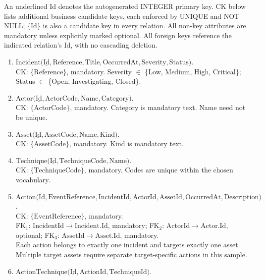\documentclass[sigconf]{acmart}
\begin{document}
An underlined \(\text{Id}\) denotes the autogenerated INTEGER primary key. CK below
lists additional business candidate keys, each enforced by UNIQUE and NOT
NULL; \(\{\text{Id}\}\) is also a candidate key in every relation. All non-key
attributes are mandatory unless explicitly marked optional. All foreign keys
reference the indicated relation's \(\text{Id}\), with no cascading deletion.
\begin{enumerate}
\item \(\text{Incident}\mathopen{(}\underline{\text{Id}},\text{Reference},\text{Title},\text{OccurredAt},\text{Severity},\text{Status}\mathclose{)}\).\\
CK: \(\{\text{Reference}\}\), mandatory. Severity \(\in\) \{Low, Medium, High, Critical\};
Status \(\in\) \{Open, Investigating, Closed\}.
\item \(\text{Actor}\mathopen{(}\underline{\text{Id}},\text{ActorCode},\text{Name},\text{Category}\mathclose{)}\).\\
CK: \(\{\text{ActorCode}\}\), mandatory. Category is mandatory text. Name need not be unique.
\item \(\text{Asset}\mathopen{(}\underline{\text{Id}},\text{AssetCode},\text{Name},\text{Kind}\mathclose{)}\).\\
CK: \(\{\text{AssetCode}\}\), mandatory. Kind is mandatory text.
\item \(\text{Technique}\mathopen{(}\underline{\text{Id}},\text{TechniqueCode},\text{Name}\mathclose{)}\).\\
CK: \(\{\text{TechniqueCode}\}\), mandatory. Codes are unique within the chosen vocabulary.
\item \(\text{Action}\mathopen{(}\underline{\text{Id}},\text{EventReference},\text{IncidentId},\text{ActorId},\text{AssetId},\text{OccurredAt},\text{Description}\mathclose{)}\).\\
CK: \(\{\text{EventReference}\}\), mandatory.\\
FK\(_1\): \(\text{IncidentId}\to \text{Incident}.\text{Id}\), mandatory;
FK\(_2\): \(\text{ActorId}\to \text{Actor}.\text{Id}\), optional;
FK\(_3\): \(\text{AssetId}\to \text{Asset}.\text{Id}\), mandatory.\\
Each action belongs to exactly one incident and targets exactly one asset.
Multiple target assets require separate target-specific actions in this sample.
\item \(\text{ActionTechnique}\mathopen{(}\underline{\text{Id}},\text{ActionId},\text{TechniqueId}\mathclose{)}\).\\

\end{enumerate}
\end{document}
